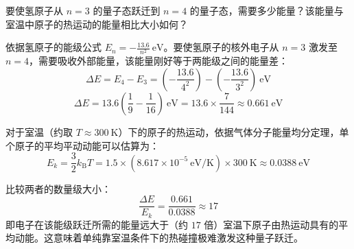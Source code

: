 \begin{exercise}\label{ex:22.12}
要使氢原子从 $n=3$ 的量子态跃迁到 $n=4$ 的量子态，需要多少能量？该能量与室温中原子的热运动的能量相比大小如何？
\end{exercise}
\begin{solution}
依据氢原子的能级公式 $E_n = - \frac{13.6}{n^2} \ \mathrm{eV}$。要使氢原子的核外电子从 $n = 3$ 激发至 $n = 4$，需要吸收外部能量，该能量刚好等于两能级之间的能量差：
$$ \Delta E = E_4 - E_3 = \left( - \frac{13.6}{4^2} \right) - \left( - \frac{13.6}{3^2} \right) \ \mathrm{eV} $$
$$ \Delta E = 13.6 \left( \frac{1}{9} - \frac{1}{16} \right) \ \mathrm{eV} = 13.6 \times \frac{7}{144} \approx 0.661 \ \mathrm{eV} $$

对于室温（约取 $T \approx 300 \ \mathrm{K}$）下的原子的热运动，依据气体分子能量均分定理，单个原子的平均平动动能可以估算为：
$$ E_k = \frac{3}{2} k_{\mathrm{B}} T = 1.5 \times \left( 8.617 \times 10^{-5} \ \mathrm{eV/K} \right) \times 300 \ \mathrm{K} \approx 0.0388 \ \mathrm{eV} $$

比较两者的数量级大小：
$$ \frac{\Delta E}{E_k} = \frac{0.661}{0.0388} \approx 17 $$
即电子在该能级跃迁所需的能量远大于（约 $17$ 倍）室温下原子由热运动具有的平均动能。这意味着单纯靠室温条件下的热碰撞极难激发这种量子跃迁。
\end{solution}

